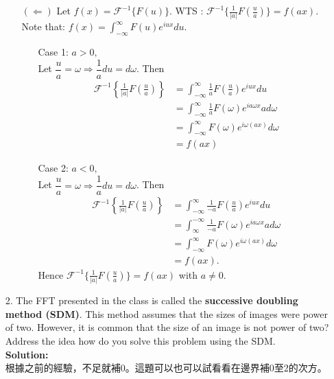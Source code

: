 \documentclass[12pt,a4paper]{article}
\begin{document}
\begin{enumerate}
\begin{enumerate}
\begin{enumerate}
\end{enumerate}
\item[$(\Longleftarrow)$]
Let $f(x)=\mathcal{F}^{-1}\{F(u)\}$.
WTS : $\mathcal{F}^{-1}
\{\frac{1}{|a|}F(\frac{u}{a})\}=f(ax)$.\\
Note that:
$f(x)= \displaystyle \int_{-\infty}^{\infty}
F(u)e^{iux}du$.

\begin{enumerate}
\item[Case 1:]
$a>0,$\\
Let $\dfrac{u}{a}=\omega
\Longrightarrow \dfrac{1}{a}du=d\omega$. Then
\begin{align*}
\mathcal{F}^{-1}
\left\{\frac{1}{|a|}F\left(\frac{u}{a}\right)\right\}
&=\displaystyle \int_{-\infty}^{\infty}\frac{1}{a}
F\left(\frac{u}{a}\right)e^{iux}du\\
&=\displaystyle \int_{-\infty}^{\infty}
\frac{1}{a} F(\omega)e^{i a\omega x}ad\omega\\
&=\displaystyle \int_{-\infty}^{\infty}
F(\omega)e^{i \omega (ax)}d\omega\\
&=f(ax)
\end{align*}

\item[Case 2:]
$a<0,$\\
Let $\dfrac{u}{a}=\omega
\Longrightarrow \dfrac{1}{a}du=d\omega$. Then
\begin{align*}
\mathcal{F}^{-1}
\left\{\frac{1}{|a|}F\left(\frac{u}{a}\right)\right\}
&=\displaystyle \int_{-\infty}^{\infty}\frac{1}{-a}
F\left(\frac{u}{a}\right)e^{iux}du\\
&=\displaystyle \int_{\infty}^{-\infty}
\frac{1}{-a} F(\omega)e^{i a\omega x}ad\omega\\
&=\displaystyle \int_{-\infty}^{\infty}
F(\omega)e^{i \omega (ax)}d\omega\\
&=f(ax).
\end{align*}
Hence $\mathcal{F}^{-1}
\{\frac{1}{|a|}F(\frac{u}{a})\}=f(ax)$
with $a \neq 0$.\\
\end{enumerate}

\end{enumerate}

\newpage
\item[2.]
The FFT presented in the class is called the
{\bf successive doubling method (SDM)}.  This 
method assumes that the sizes of images were
power of two. However, it is common that the 
size of an image is not power of two? Address 
the idea how do you solve this problem using 
the SDM.\\
{\bf Solution:}\\
根據之前的經驗，不足就補0。這題可以也可以試看看在邊界補0至2的次方。
\end{enumerate}
\end{document}
